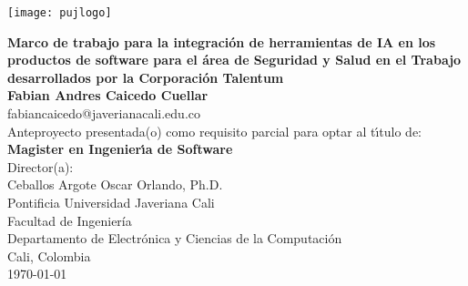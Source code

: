 \begin{center}
\thispagestyle{empty}
\vspace*{-2.2cm}
\begin{center}
    \texttt{[image: pujlogo]}~\\[1cm]
\end{center}
\textbf{\huge
Marco de trabajo para la integración de herramientas de IA en los productos de software para el área de Seguridad y Salud en el Trabajo desarrollados por la Corporación Talentum
}\\[1.2cm]

\Large\textbf{Fabian Andres Caicedo Cuellar}\\
\small fabiancaicedo@javerianacali.edu.co\\[1cm]
\small Anteproyecto presentada(o) como requisito parcial para optar al
t\'{\i}tulo de:\\
\textbf{Magister en Ingenier\'{\i}a de Software}\\[1cm]
Director(a):\\
Ceballos Argote Oscar Orlando, Ph.D.\\[1.2cm]

Pontificia Universidad Javeriana Cali\\
Facultad de Ingeniería\\
Departamento de Electrónica y Ciencias de la Computación\\
Cali, Colombia\\
\today\\
\end{center}
